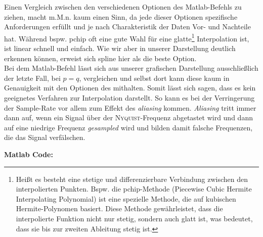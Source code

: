 \begin{enumerate}[label=\alph*)]
	Einen Vergleich zwischen den verschiedenen Optionen des Matlab-Befehls  zu ziehen, macht m.M.n. kaum einen Sinn, da jede dieser Optionen spezifische Anforderungen erfüllt und je nach Charakteristik der Daten Vor- und Nachteile hat. Während bspw. pchip oft eine gute Wahl für eine glatte\footnote{Heißt es besteht eine stetige und differenzierbare Verbindung zwischen den interpolierten Punkten. Bspw. die pchip-Methode (Piecewise Cubic Hermite Interpolating Polynomial) ist eine spezielle Methode, die auf kubischen Hermite-Polynomen basiert. Diese Methode gewährleistet, dass die interpolierte Funktion nicht nur stetig, sondern auch glatt ist, was bedeutet, dass sie bis zur zweiten Ableitung stetig ist.} Interpolation ist, ist linear schnell und einfach. Wie wir aber in unserer Darstellung deutlich erkennen können, erweist sich spline hier als die beste Option.\\
	Bei dem Matlab-Befehl  lässt sich aus unserer grafischen Darstellung ausschließlich der letzte Fall, bei $p=q$, vergleichen und selbst dort kann diese kaum in Genauigkeit mit den Optionen des  mithalten. Somit lässt sich sagen, dass es kein geeignetes Verfahren zur Interpolation darstellt. So kann es bei der Verringerung der Sample-Rate vor allem zum Effekt des \textit{aliasing} kommen. \textit{Aliasing} tritt immer dann auf, wenn ein Signal über der \textsc{Nyquist}-Frequenz abgetastet wird und dann auf eine niedrige Frequenz \textit{gesampled} wird und bilden damit falsche Frequenzen, die das Signal verfälschen.
\end{enumerate}
\clearpage

\textbf{Matlab Code:}
